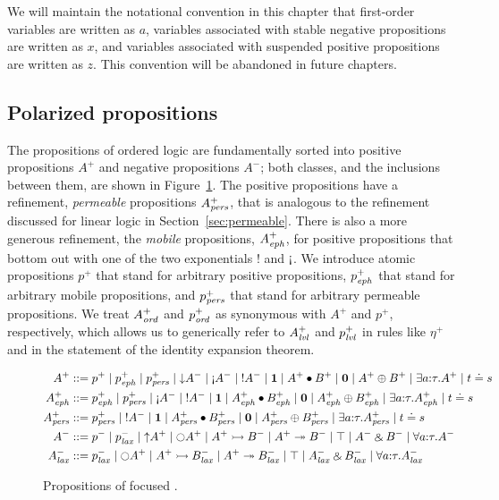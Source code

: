 We will maintain the notational convention in this chapter that
first-order variables are written as $a$, variables associated
with stable negative propositions are written as $x$, and variables
associated with suspended positive propositions are written as 
$z$. This convention will be abandoned in future chapters.

\subsection{Polarized propositions}

The propositions of ordered logic are fundamentally sorted into
positive propositions $A^+$ and negative propositions $A^-$; both
classes, and the inclusions between them, 
are shown in Figure~\ref{fig:ordered}. The
positive propositions have a refinement, {\it permeable} propositions
$A^+_{\it pers}$, that is analogous to the refinement discussed for linear
logic in Section~\ref{sec:permeable}. There is also a more generous
refinement, the {\it mobile} propositions, $A^+_{\it eph}$, for positive
propositions that bottom out with one of the two exponentials ${!}$ and
${\gnab}$. We introduce atomic propositions $p^+$ that stand for
arbitrary positive propositions, $p^+_{\it eph}$ that stand for arbitrary
mobile propositions, and $p^+_{\it pers}$ that stand for arbitrary
permeable propositions. We treat $A^+_{\it ord}$ and $p^+_{\it ord}$ as synonymous
with $A^+$ and $p^+$, respectively, which allows us to generically
refer to $A^+_{\it lvl}$ and $p^+_{\it lvl}$ in rules like $\eta^+$ and in the
statement of the identity expansion theorem.

\begin{figure}
\begin{align*}
A^+ & ::= p^+ \mid p^+_\meph \mid p^+_\mpers
        \mid {\downarrow}A^- \mid {\gnab}A^- \mid {!}A^- 
        \mid \one \mid A^+ \fuse B^+ \mid \zero \mid A^+ \oplus B^+ 
        \mid \exists a{:}\tau. A^+ \mid t \doteq s
\\
A^+_\meph & ::= p^+_\meph \mid p^+_\mpers
        \mid {\gnab}A^- \mid {!}A^- 
        \mid \one \mid A^+_\meph \fuse B^+_\meph
        \mid \zero \mid A^+_\meph \oplus B^+_\meph
        \mid \exists a{:}\tau. A^+_\meph \mid t \doteq s
\\
A^+_\mpers & ::= p^+_\mpers 
        \mid {!}A^- 
        \mid \one \mid A^+_\mpers \fuse B^+_\mpers 
        \mid \zero \mid A^+_\mpers \oplus B^+_\mpers
        \mid \exists a{:}\tau. A^+_\mpers \mid t \doteq s
\\
A^- & ::= p^- \mid p^-_\mlax 
        \mid {\uparrow}A^+ \mid {\ocircle}A^+
        \mid A^+ \lefti B^- \mid A^+ \righti B^-
        \mid \top \mid A^- \with B^-
        \mid \forall a{:}\tau.A^-
\\
A^-_\mlax & ::= p^-_\mlax 
        \mid {\ocircle}A^+
        \mid A^+ \lefti B^-_\mlax \mid A^+ \righti B^-_\mlax
        \mid \top \mid A^-_\mlax \with B^-_\mlax
        \mid \forall a{:}\tau.A^-_\mlax
\end{align*}
\caption{Propositions of focused \ollll.}
\label{fig:ordered}
\end{figure}

